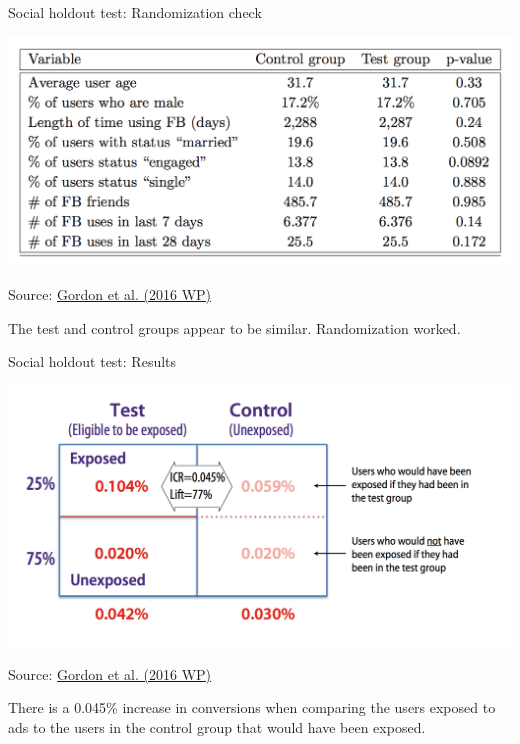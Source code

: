 \documentclass[10pt, aspectratio=169]{beamer}
\newcommand{\source}[1]{\begin{flushright} \footnotesize Source: {#1} \end{flushright} \normalsize}
\begin{document}
\begin{frame}{Social holdout test: Randomization check}
\begin{center}
\includegraphics[height=0.6\textheight]{images/gordonetalrandomizationcheck.png}\\
\source{\href{https://github.com/eleafeit/ad_response_tutorial/blob/master/Papers/Gordonetal2016WPFieldExperimentsatFacebook.pdf}{Gordon et al. (2016 WP)}}
\alert{The test and control groups appear to be similar. Randomization worked.}
\end{center}
\end{frame}

\begin{frame}{Social holdout test: Results}
\begin{center}
\includegraphics[height=0.6\textheight]{images/gordonetalresult.png}\\
\end{center}
\source{\href{https://github.com/eleafeit/ad_response_tutorial/blob/master/Papers/Gordonetal2016WPFieldExperimentsatFacebook.pdf}{Gordon et al. (2016 WP)}}
\alert{There is a 0.045\% increase in conversions when comparing the users exposed to ads to the users in the control group that would have been exposed.}
\end{frame}
\end{document}
